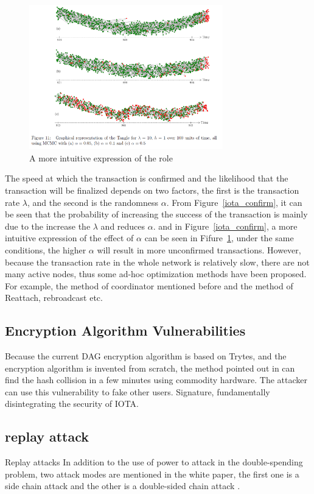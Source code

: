 \begin{figure}[!ht]
\begin{center}
	\includegraphics[width=0.75\textwidth]{figures/dagvis.png}
	\caption{A more intuitive expression of the role}
	\label{dagvis}
\end{center}
\end{figure}

The speed at which the transaction is confirmed and the likelihood that the transaction will be finalized depends on two factors, the first is the transaction rate $\lambda$, and the second is the randomness $\alpha$. 
From Figure~\ref{iota_confirm}, it can be seen that the probability of increasing the success of the transaction is mainly due to the increase the $\lambda$ and reduces $\alpha$. 
and in Figure~\ref{iota_confirm}, a more intuitive expression of the effect of $\alpha$ can be seen in Fifure~\ref{dagvis}, under the same conditions, the higher $\alpha$ will result in more unconfirmed transactions.
However, because the transaction rate in the whole network is relatively slow, there are not many active nodes, thus some ad-hoc optimization methods have been proposed.
For example, the method of coordinator mentioned before and the method of Reattach, rebroadcast etc. 

\subsection{Encryption Algorithm Vulnerabilities}
Because the current DAG encryption algorithm is based on Trytes, 
and the encryption algorithm is invented from scratch, the method pointed out in \cite{iota_collision} can find the hash collision in a few minutes using commodity hardware. 
The attacker can use this vulnerability to fake other users. Signature, fundamentally disintegrating the security of IOTA.

\subsection{ replay attack}
Replay attacks In addition to the use of power to attack in the double-spending problem, 
two attack modes are mentioned in the white paper, the first one is a side chain attack and the other is a double-sided chain attack \cite{iota_proof}. 

